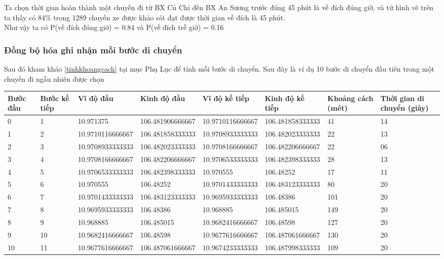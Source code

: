 \documentclass[a4paper, 13pt]{report}
\begin{document}
\FloatBarrier
Ta chọn thời gian hoàn thành một chuyến đi từ BX Củ Chi đến BX An Sương trước đúng 45 phút là về đích đúng giờ, và từ hình vẽ trên ta thấy có 84\% trong 1289 chuyến xe được khảo sát đạt được thời gian về đích là 45 phút.\\
Như vậy ta có $\mathrm{P}$(về đích đúng giờ) = 0.84 và $\mathrm{P}$(về đích trễ giờ) = 0.16
\subsubsection{Đồng bộ hóa ghi nhận mỗi bước di chuyển}
Sau đó kham khảo \ref{tinhkhoangcach} tại mục Phụ Lục để tính mỗi bước di chuyển. Sau đây là ví dụ 10 bước di chuyển đầu tiên trong một chuyến đi ngẫu nhiên được chọn\\
\begin{flushleft}
\begin{tabular}{|p{1cm}|p{1cm}|p{2.6cm}|p{2.6cm}|p{2.6cm}|p{2.6cm}|p{1cm}|p{1cm}| }
\hline
Bước đầu & Bước kế tiếp & Vĩ độ đầu & Kinh độ đầu & Vĩ độ kế tiếp & Kinh độ kế tiếp & Khoảng cách (mét) & Thời gian di chuyển (giây) \\ 
\hline
0 & 1 & 10.971375 & 106.481906666667 & 10.9710116666667 & 106.481858333333 & 41 & 14 \\
\hline
1 & 2 & 10.9710116666667 & 106.481858333333 & 10.9708933333333 & 106.482023333333 & 22 & 13 \\
\hline
2 & 3 & 10.9708933333333 & 106.482023333333 & 10.9708166666667 & 106.482206666667 & 22 & 06 \\
\hline
3 & 4 & 10.9708166666667 & 106.482206666667 & 10.9706533333333 & 106.482398333333 & 28 & 13 \\
\hline
4 & 5 & 10.9706533333333 & 106.482398333333 & 10.970555 & 106.48252 & 17 & 11 \\
\hline
5 & 6 & 10.970555 & 106.48252 & 10.9701433333333 & 106.483123333333 & 80 & 20 \\
\hline
6 & 7 & 10.9701433333333 & 106.483123333333 & 10.9695933333333 & 106.48386 & 101 & 20 \\
\hline
7 & 8 & 10.9695933333333 & 106.48386 & 10.968885 & 106.485015 & 149 & 20 \\
\hline
8 & 9 & 10.968885 & 106.485015 & 10.9682416666667 & 106.48598 & 127 & 20 \\
\hline
9 & 10 & 10.9682416666667 & 106.48598 & 10.9677616666667 & 106.487061666667 & 130 & 20 \\
\hline
10 & 11 & 10.9677616666667 & 106.487061666667 & 10.9674233333333 & 106.487998333333 & 109 & 20 \\
\hline 
\end{tabular}
\end{flushleft}
\end{document}
